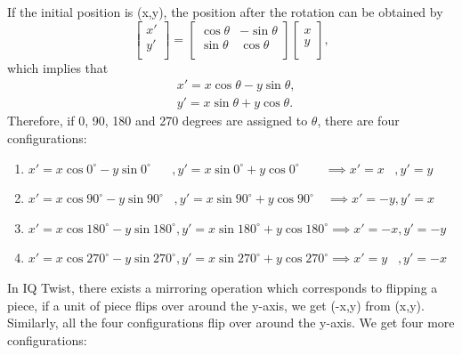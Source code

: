 If the initial position is (x,y), the position after the rotation can be obtained by
\begin{equation}
\label{equation:rotation}
\begin{bmatrix}
x'\\
y'\\
\end{bmatrix}
=\begin{bmatrix}
\cos\theta & -\sin\theta\\
\sin\theta & \cos\theta\\
\end{bmatrix}
\begin{bmatrix}
x\\
y\\
\end{bmatrix},
\end{equation}
which implies that 
\begin{equation}
\label{equation:formula1}
\begin{aligned}
&x'=x\cos\theta-y\sin\theta,\\
&y'=x\sin\theta+y\cos\theta.
\end{aligned}
\end{equation}
Therefore, if 0, 90, 180 and 270 degrees are assigned to $\theta$, there are four configurations:
\begin{enumerate}
  \item $x'=x\cos0^{\circ} - y\sin0^{\circ}\hspace{20pt},y'=x\sin0^{\circ} + y\cos0^{\circ}\hspace{24pt}\implies x'=x\hspace{10pt}, y'=y$
  \item $x'=x\cos90^{\circ} - y\sin90^{\circ}\hspace{10pt},y'=x\sin90^{\circ} + y\cos90^{\circ}\hspace{12pt}\implies x'=-y, y'=x$
  \item $x'=x\cos180^{\circ} - y\sin180^{\circ}, y'=x\sin180^{\circ} + y\cos180^{\circ} \implies x'=-x, y'=-y$
  \item $x'=x\cos270^{\circ} - y\sin270^{\circ}, y'=x\sin270^{\circ} + y\cos270^{\circ} \implies x'=y\hspace{10pt},y'=-x$
  \label{rotation4}
\end{enumerate}
In IQ Twist, there exists a mirroring operation which corresponds to flipping a piece, if a unit of piece flips over around the y-axis, we get  (-x,y) from (x,y). Similarly, all the four configurations flip over around the y-axis. We get four more configurations: 
